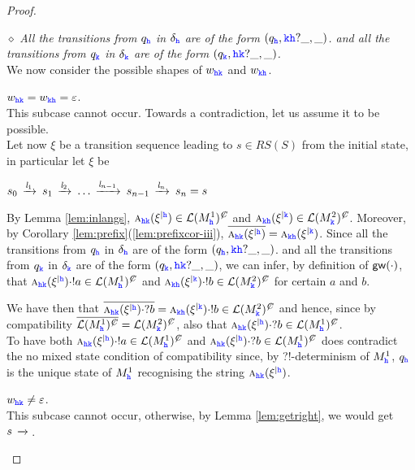 \begin{proof}
\begin{description}
\underline{$\diamond$}
{\em  All the transitions from $q_\HH$ in $\delta_\HH$ are of the form $(q_\HH,\KK\HH?\_,\_)$. and
all the transitions from $q_\KK$ in $\delta_\KK$ are of the form $(q_\KK,\HH\KK?\_,\_)$.}\\
We now consider the possible shapes of $w_{\HH\KK}$ and $w_{\KK\HH}$.
\begin{description}
\item
 $w_{\HH\KK}=w_{\KK\HH}=\varepsilon$.\\
This subcase cannot occur. Towards a contradiction, let us assume it to be possible.\\
Let now $\xi$ be a transition sequence leading to $s\in RS(S)$ from the initial state, in particular let $\xi$ be\\
\centerline{
$s_0\lts{\elle_1}s_1\lts{\elle_2} \ldots \lts{\elle_{n-1}}s_{n-1}\lts{\elle_n}s_n=s$
}
 By Lemma \ref{lem:inlangs},
 $\symb{\HH\KK}{\restrictup{\xi}{\HH}}\in\lang{M^1_\HH}^\mC $ and $\symb{\KK\HH}{\restrictup{\xi}{\KK}}\in\lang{M^2_\KK}^\mC$. Moreover, by Corollary \ref{lem:prefix}(\ref{lem:prefixcor-iii}),
  $\Dual{\symb{\HH\KK}{\restrictup{\xi}{\HH}}}=\symb{\KK\HH}{\restrictup{\xi}{\KK}}$.
  Since all the transitions from $q_\HH$ in $\delta_\HH$ are of the form $(q_\HH,\KK\HH?\_,\_)$. and
all the transitions from $q_\KK$ in $\delta_\KK$ are of the form $(q_\KK,\HH\KK?\_,\_)$,
we can infer, by definition of $\gateway{\cdot}$, that  $\symb{\HH\KK}{\restrictup{\xi}{\HH}}\cdot !a\in\lang{M^1_\HH}^\mC $ and $\symb{\KK\HH}{\restrictup{\xi}{\KK}}\cdot !b\in\lang{M^2_\KK}^\mC$ for certain $a$ and $b$.

We have then that $\Dual{\symb{\HH\KK}{\restrictup{\xi}{\HH}}\cdot ?b} = {\symb{\KK\HH}{\restrictup{\xi}{\KK}}\cdot !b} \in\lang{M^2_\KK}^\mC$
and hence, since by compatibility $\Dual{\lang{M^1_\HH}^\mC} = \lang{M^2_\KK}^\mC$, also that
 $\symb{\HH\KK}{\restrictup{\xi}{\HH}}\cdot ?b\in \lang{M^1_\HH}^\mC$.\\
 To have both $\symb{\HH\KK}{\restrictup{\xi}{\HH}}\cdot !a\in\lang{M^1_\HH}^\mC $ and 
 $\symb{\HH\KK}{\restrictup{\xi}{\HH}}\cdot ?b\in \lang{M^1_\HH}^\mC$
does contradict the no mixed state condition of compatibility since,
 by ?!-determinism of $M^1_\HH$, ${q}_\HH$ is the unique state of $M^1_\HH$ 
recognising the string $\symb{\HH\KK}{\restrictup{\xi}{\HH}}$. 

\item 
$w_{\HH\KK}\neq\varepsilon$.\\
This subcase cannot occur, otherwise, by Lemma \ref{lem:getright}, we would get $s\lts{}$.


\end{description}
\end{description}
\end{proof}
